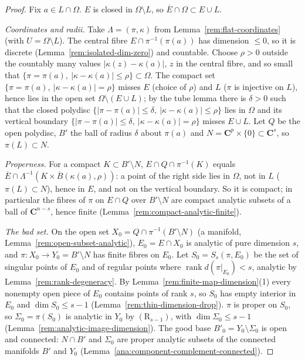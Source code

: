 \begin{proof}
\leanok
Fix \(a\in L\cap\Omega\). \(E\) is closed in \(\Omega\setminus L\), so \(\overline E\cap\Omega\subset E\cup L\).

\emph{Coordinates and radii.} Take \(\Lambda=(\pi,\kappa)\) from Lemma~\ref{rem:flat-coordinates} (with \(U=\Omega\setminus L\)). The central fibre
\(E\cap\pi^{-1}(\pi(a))\) has dimension \(\le0\), so it is discrete (Lemma~\ref{rem:isolated-dim-zero}) and countable. Choose \(\rho>0\) outside the
countably many values \(|\kappa(z)-\kappa(a)|\), \(z\) in the central fibre, and so small that \(\{\pi=\pi(a),\ |\kappa-\kappa(a)|\le\rho\}\subset\Omega\).
The compact set \(\{\pi=\pi(a),\ |\kappa-\kappa(a)|=\rho\}\) misses \(E\) (choice of \(\rho\)) and \(L\) (\(\pi\) is injective on \(L\)), hence lies in the
open set \(\Omega\setminus(E\cup L)\); by the tube lemma there is \(\delta>0\) such that the closed polydisc \(\{|\pi-\pi(a)|\le\delta,\
|\kappa-\kappa(a)|\le\rho\}\) lies in \(\Omega\) and its vertical boundary \(\{|\pi-\pi(a)|\le\delta,\ |\kappa-\kappa(a)|=\rho\}\) misses \(E\cup L\). Let
\(Q\) be the open polydisc, \(B'\) the ball of radius \(\delta\) about \(\pi(a)\) and \(N=\mathbf C^p\times\{0\}\subset\mathbf C^s\), so \(\pi(L)\subset N\).

\emph{Properness.} For a compact \(K\subset B'\setminus N\), \(E\cap Q\cap\pi^{-1}(K)\) equals \(\overline E\cap\Lambda^{-1}(K\times\overline{B}(\kappa(a),\rho))\):
a point of the right side lies in \(\Omega\), not in \(L\) (\(\pi(L)\subset N\)), hence in \(E\), and not on the vertical boundary. So it is compact; in
particular the fibres of \(\pi\) on \(E\cap Q\) over \(B'\setminus N\) are compact analytic subsets of a ball of \(\mathbf C^{n-s}\), hence finite
(Lemma~\ref{rem:compact-analytic-finite}).

\emph{The bad set.} On the open set \(X_0=Q\cap\pi^{-1}(B'\setminus N)\) (a manifold, Lemma~\ref{rem:open-subset-analytic}), \(E_0=E\cap X_0\) is analytic
of pure dimension \(s\), and \(\pi\colon X_0\to Y_0=B'\setminus N\) has finite fibres on \(E_0\). Let \(S_0=S_s(\pi,E_0)\) be the set of singular points
of \(E_0\) and of regular points where \(\operatorname{rank}d(\pi|_{E_0})<s\), analytic by Lemma~\ref{rem:rank-degeneracy}. By
Lemma~\ref{rem:finite-map-dimension}(1) every nonempty open piece of \(E_0\) contains points of rank \(s\), so \(S_0\) has empty interior in \(E_0\) and
\(\dim S_0\le s-1\) (Lemma~\ref{rem:thin-dimension-drop}). \(\pi\) is proper on \(S_0\), so \(\Sigma_0=\pi(S_0)\) is analytic in \(Y_0\) by
\((\mathrm R_{s-1})\), with \(\dim\Sigma_0\le s-1\) (Lemma~\ref{rem:analytic-image-dimension}). The good base \(B'_0=Y_0\setminus\Sigma_0\) is open and
connected: \(N\cap B'\) and \(\Sigma_0\) are proper analytic subsets of the connected manifolds \(B'\) and \(Y_0\)
(Lemma~\ref{ana:component-complement-connected}).


\end{proof}
